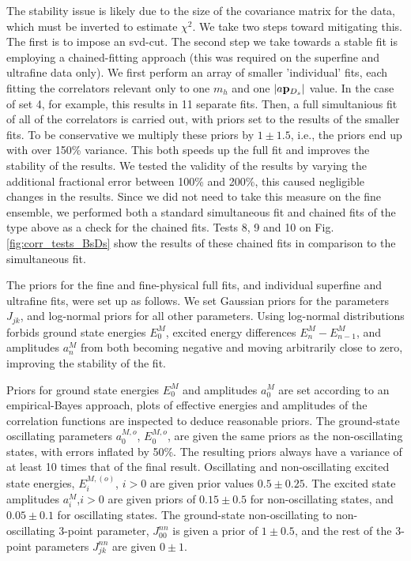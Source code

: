 The stability issue is likely due to the size of the covariance matrix for the data, which must be inverted to estimate $\chi^2$. We take two steps toward mitigating this. The first is to impose an svd-cut. The second step we take towards a stable fit is employing a chained-fitting approach (this was required on the superfine and ultrafine data only). We first perform an array of smaller 'individual' fits, each fitting the correlators relevant only to one $m_h$ and one $|a{\bf{p}}_{D_s}|$ value. In the case of set 4, for example, this results in 11 separate fits. Then, a full simultanious fit of all of the correlators is carried out, with priors set to the results of the smaller fits. To be conservative we multiply these priors by $1\pm 1.5$, i.e., the priors end up with over 150\% variance. This both speeds up the full fit and improves the stability of the results. We tested the validity of the results by varying the additional fractional error between 100\% and 200\%, this caused negligible changes in the results. Since we did not need to take this measure on the fine ensemble, we performed both a standard simultaneous fit and chained fits of the type above as a check for the chained fits. Tests 8, 9 and 10 on Fig. \ref{fig:corr_tests_BsDs} show the results of these chained fits in comparison to the simultaneous fit.

The priors for the fine and fine-physical full fits, and individual superfine and ultrafine fits, were set up as follows. We set Gaussian priors for the parameters $J_{jk}$, and log-normal priors for all other parameters. Using log-normal distributions forbids ground state energies $E_0^M$, excited energy differences $E_n^M-E_{n-1}^M$, and amplitudes $a_n^M$ from both becoming negative and moving arbitrarily close to zero, improving the stability of the fit.

Priors for ground state energies $E_0^M$ and amplitudes $a_0^M$ are set according to an empirical-Bayes approach, plots of effective energies and amplitudes of the correlation functions are inspected to deduce reasonable priors. The ground-state oscillating parameters $a_0^{M,o}$, $E_0^{M,o}$, are given the same priors as the non-oscillating states, with errors inflated by 50\%. The resulting priors always have a variance of at least 10 times that of the final result. Oscillating and non-oscillating excited state energies, $E_i^{M,(o)}$, $i>0$ are given prior values $0.5\pm 0.25$. The excited state amplitudes $a_i^M$,$i>0$ are given priors of $0.15\pm 0.5$ for non-oscillating states, and $0.05\pm0.1$ for oscillating states. The ground-state non-oscillating to non-oscillating 3-point parameter, $J_{00}^{nn}$ is given a prior of $1\pm 0.5$, and the rest of the 3-point parameters $J_{jk}^{nn}$ are given $0\pm 1$.

